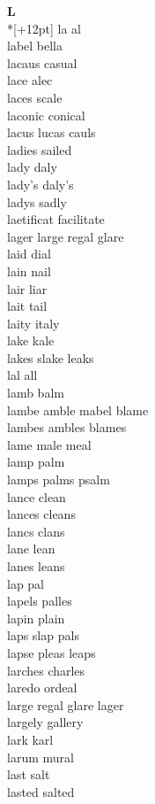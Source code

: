 \vspace{14pt}
\noindent\textbf{\Large L}\\*[+12pt]
la al\\
label bella\\
lacaus casual\\
lace alec\\
laces scale\\
laconic conical\\
lacus lucas cauls\\
ladies sailed\\
lady daly\\
lady's daly's\\
ladys sadly\\
laetificat facilitate\\
lager large regal glare\\
laid dial\\
lain nail\\
lair liar\\
lait tail\\
laity italy\\
lake kale\\
lakes slake leaks\\
lal all\\
lamb balm\\
lambe amble mabel blame\\
lambes ambles blames\\
lame male meal\\
lamp palm\\
lamps palms psalm\\
lance clean\\
lances cleans\\
lancs clans\\
lane lean\\
lanes leans\\
lap pal\\
lapels palles\\
lapin plain\\
laps slap pals\\
lapse pleas leaps\\
larches charles\\
laredo ordeal\\
large regal glare lager\\
largely gallery\\
lark karl\\
larum mural\\
last salt\\
lasted salted\\
